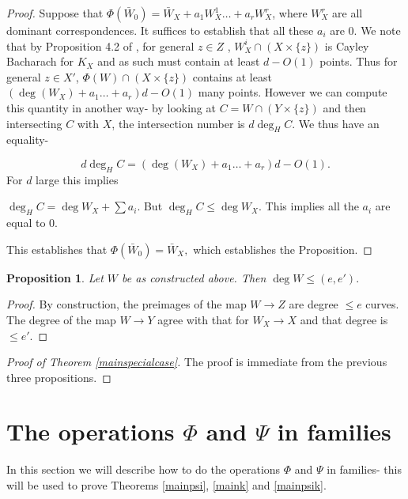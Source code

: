 \documentclass[12pt]{amsart}
\numberwithin{equation}{section}
\newtheorem{proposition}[theorem]{Proposition}
\numberwithin{theorem}{section}
\theoremstyle{definition}
\theoremstyle{definition}
\begin{document}
\begin{proof}
Suppose that $\Phi(\bar W_0) =  \bar W_X + a_1W_X^1 \dots +a_rW_X^r$, where $W_X^r$ are all dominant correspondences.  It suffices to establish that all these $a_i$ are 0.
We note that by Proposition 4.2 of \cite{Bast}, for general $ z\in Z$ , $W_X^i \cap (X \times \{z\})$  is Cayley Bacharach for $K_X$ and as such must contain at least $d- O(1)$ points.  
Thus for general $z \in X'$, $\Phi(W) \cap (X \times \{z\})$ contains at least $(\deg(W_X) + a_1 \dots + a_r)d - O(1)$ many points.
However we can compute this quantity in another way- by looking at $C = W \cap (Y \times \{z\})$ and then intersecting $C$ with $X$, the intersection number is $d \deg_H C$. We thus have an equality-

$$d \deg_H C = (\deg(W_X) + a_1 \dots + a_r)d - O(1).$$ For $d$ large this implies

$\deg_H C = \deg W_X + \sum a_i$. But $\deg_H C \le \deg W_X$. This implies all the $a_i$ are equal to $0$.

This establishes that $\Phi(\bar W_0) = \bar W_X,$ which establishes the Proposition.
    \end{proof}

\begin{proposition}
    Let $W$ be as constructed above. Then $\deg W \le (e,e').$
\end{proposition}
\begin{proof}

By construction, the preimages of the map $W \to Z$ are degree $ \le e$ curves. The degree  of the map $W \to Y$ agree with that for $W_X \to X$ and that degree is $\le e'$.

\end{proof}

\begin{proof}[Proof of Theorem \ref{mainspecialcase}]
    The proof is immediate from the previous three propositions.
\end{proof}

\section{The operations $\Phi$ and $\Psi$ in families}


In this section we will describe how to do the operations $\Phi$ and $\Psi$ in families- this will be used  to prove Theorems \ref{mainpsi}, \ref{maink} and \ref{mainpsik}.
\end{document}
